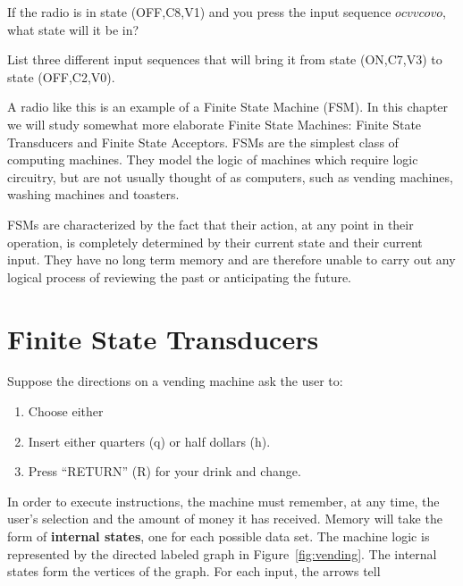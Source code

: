 \begin{prb}
If the radio is in state {\rm(OFF,C8,V1)} and you press the input sequence $ocvvcovo$, what state will it be in?
\end{prb}

\begin{prb}
List three different input sequences that will bring it from state {\rm(ON,C7,V3)} to state {\rm(OFF,C2,V0)}.
\end{prb}

A radio like this is an example of a  Finite State Machine (FSM).  In this chapter we will study somewhat more elaborate Finite State Machines:  Finite State Transducers and Finite State Acceptors. FSMs are the simplest class of computing machines.  They model the logic of machines which require logic circuitry, but are not usually thought of as computers, such as vending machines, washing machines and toasters.

FSMs are characterized by the fact that their action, at any point in their operation, is completely determined by their current state and their current input.  They have no long term memory and are therefore unable to carry out any logical process of reviewing the past or anticipating the future.


\section{Finite State Transducers}

Suppose the directions on a vending machine ask the user to:
\begin{enumerate}
  \item Choose either
  \item Insert either quarters (q) or half dollars (h).
  \item Press ``RETURN'' (R) for your drink and change.
\end{enumerate}
In order to execute instructions, the machine must remember, at any time, the user's selection and the amount of money it has received.  Memory will take the form of \textbf{internal states}, one for each possible data set.  The machine logic is represented by the directed labeled graph in Figure~\ref{fig:vending}.  The internal states form the vertices of the graph.  For each input, the arrows tell
\goodbreak


